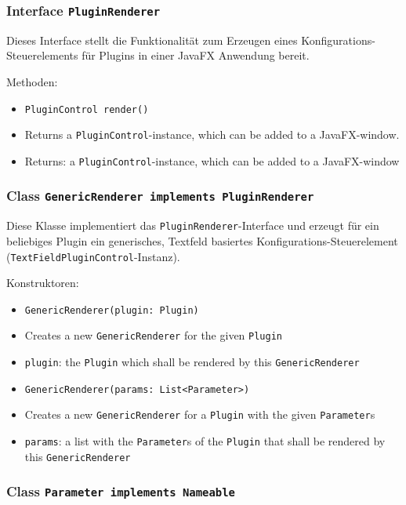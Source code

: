 \documentclass[parskip=full,11pt]{scrartcl}
\begin{document}
\subsubsection{Interface \texttt{PluginRenderer}}

Dieses Interface stellt die Funktionalität zum Erzeugen eines Konfigurations-Steuerelements für Plugins in einer JavaFX Anwendung bereit.

Methoden:

\begin{itemize}\itemsep -10pt
	\item \texttt{PluginControl render()}
	\item[] Returns a \texttt{PluginControl}-instance, which can be added to a JavaFX-window.
	\item[] Returns: a \texttt{PluginControl}-instance, which can be added to a JavaFX-window
\end{itemize}

\subsubsection{Class \texttt{GenericRenderer implements PluginRenderer}}

Diese Klasse implementiert das \texttt{PluginRenderer}-Interface und erzeugt für ein beliebiges Plugin ein generisches, Textfeld basiertes Konfigurations-Steuerelement (\texttt{TextFieldPluginControl}-Instanz).

Konstruktoren:

\begin{itemize}\itemsep -10pt
	\item \texttt{GenericRenderer(plugin: Plugin)}
	\item[] Creates a new \texttt{GenericRenderer} for the given \texttt{Plugin}
	\item[] \texttt{plugin}: the \texttt{Plugin} which shall be rendered by this \texttt{GenericRenderer}
	
	\item \texttt{GenericRenderer(params: List<Parameter>)}
	\item[] Creates a new \texttt{GenericRenderer} for a \texttt{Plugin} with the given \texttt{Parameter}s
	\item[] \texttt{params}: a list with the \texttt{Parameter}s of the \texttt{Plugin} that shall be rendered by this \texttt{GenericRenderer}
\end{itemize} 

\subsubsection{Class \texttt{Parameter implements Nameable}}
\end{document}
